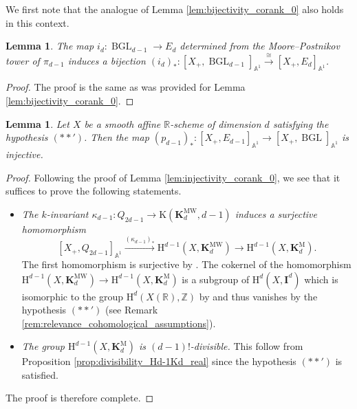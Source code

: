 \documentclass[11pt,leqno]{amsart}
\renewcommand{\1}{{\rm 1\hspace*{-0.4ex}%
\rule{0.1ex}{1.52ex}\hspace*{0.2ex}}}
\newcommand{\Hr}{{\mathrm {H}}}
\newcommand{\<}[1]{{\langle}#1 {\rangle}}
\newcommand{\Ibf}{\mathbf{I}}
\newcommand{\Rb}{\mathbb{R}}
\newcommand{\Kr}{\mathrm{K}}
\newcommand{\Zb}{\mathbb{Z}}
\newcommand{\Kbf}{\mathbf{K}}
\newcommand{\Abb}{\mathbb{A}}
\newcommand{\BGL}{\operatorname{BGL}}
\newcommand{\Mr}{\mathrm{M}}
\newcommand{\MW}{\mathrm{MW}}
\theoremstyle{plain}
\newtheorem{lem}[thm]{Lemma}
\theoremstyle{definition}
\theoremstyle{remark}
\numberwithin{equation}{section}
\begin{document}
We first note that the analogue of Lemma \ref{lem:bijectivity_corank_0} also holds in this context.

\begin{lem}\label{lem:bijectivity_corank_1}
The map $i_d:\BGL_{d-1}\to E_d$ determined from the Moore--Postnikov tower of $\pi_{d-1}$ induces a bijection $(i_d)_*:[X_+,\BGL_{d-1}]_{\Abb^1}\xrightarrow{\cong}[X_+,E_d]_{\Abb^1}$.
\end{lem}

\begin{proof}
The proof is the same as was provided for Lemma \ref{lem:bijectivity_corank_0}.
\end{proof}


\begin{lem}\label{lem:corank_1_first_stage_bijective}
Let $X$ be a smooth affine $\Rb$-scheme of dimension $d$ satisfying the hypothesis $(**')$. Then the map $(p_{d-1})_*:[X_+,E_{d-1}]_{\Abb^1}\to[X_+,\BGL]_{\Abb^1}$ is injective.
\end{lem}

\begin{proof}
Following the proof of Lemma \ref{lem:injectivity_corank_0}, we see that it suffices to prove the following statements.
\begin{itemize}
    \item \emph{The $k$-invariant $\kappa_{d-1}:Q_{2d-1}\rightarrow\Kr(\Kbf_d^\MW,d-1)$ induces a surjective homomorphism} \[[X_+,Q_{2d-1}]_{\Abb^1}\xrightarrow{(\kappa_{d-1})_*}\Hr^{d-1}(X,\Kbf_d^\MW)\to\Hr^{d-1}(X,\Kbf_d^\Mr).\] The first homomorphism is surjective by \cite[Proposition 1.2.6]{asokEulerClassGroups2021}. The cokernel of the homomorphism $\Hr^{d-1}(X,\Kbf_d^\MW)\to\Hr^{d-1}(X,\Kbf_d^\Mr)$ is a subgroup of $\Hr^{d}(X,\Ibf^d)$ which is isomorphic to the group $\Hr^d(X(\Rb),\Zb)$ by \cite[Theorem 3.5]{lerbetImageHigherSignature2026} and thus vanishes by the hypothesis $(**')$ (see Remark \ref{rem:relevance_cohomological_assumptions}).
    \item \emph{The group $\Hr^{d-1}(X,\Kbf_d^\Mr)$ is $(d-1)!$-divisible.} This follow from Proposition \ref{prop:divisibility_Hd-1Kd_real} since the hypothesis $(**')$ is satisfied.
\end{itemize}
The proof is therefore complete.
\end{proof}
\end{document}
